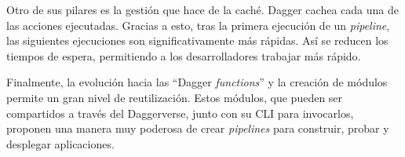 Otro de sus pilares es la gestión que hace de la caché. Dagger cachea cada una de las acciones ejecutadas. Gracias a esto, tras la primera ejecución de un \textit{pipeline}, las siguientes ejecuciones son significativamente más rápidas. Así se reducen los tiempos de espera, permitiendo a los desarrolladores trabajar más rápido.

Finalmente, la evolución hacia las ``Dagger \textit{functions}'' y la creación de módulos permite un gran nivel de reutilización. Estos módulos, que pueden ser compartidos a través del Daggerverse, junto con su CLI para invocarlos, proponen una manera muy poderosa de crear \textit{pipelines} para construir, probar y desplegar aplicaciones.
